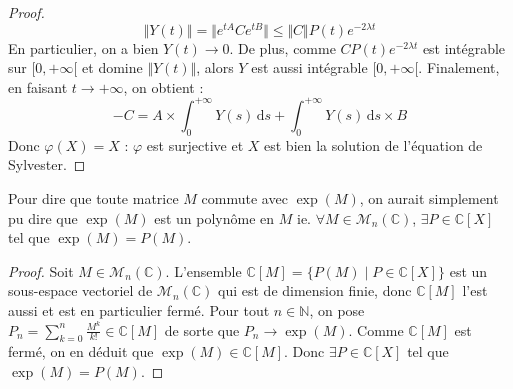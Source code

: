 \begin{proof}
		\[ \Vert Y(t) \Vert = \Vert e^{tA} C e^{tB} \Vert \leq \Vert C \Vert P(t) e^{-2 \lambda t} \]
		En particulier, on a bien $Y(t) \longrightarrow 0$. De plus, comme $C P(t) e^{-2 \lambda t}$ est intégrable sur $[0, +\infty[$ et domine $\Vert Y(t) \Vert$, alors $Y$ est aussi intégrable $[0, +\infty[$. Finalement, en faisant $t \longrightarrow +\infty$, on obtient :
		\[ -C = A \times \int_{0}^{+\infty} Y(s) \, \mathrm{d}s + \int_{0}^{+\infty} Y(s) \, \mathrm{d}s \times B \]
		Donc $\varphi(X) = X$ : $\varphi$ est surjective et $X$ est bien la solution de l'équation de Sylvester.
	\end{proof}


	\begin{remark}
		Pour dire que toute matrice $M$ commute avec $\exp(M)$, on aurait simplement pu dire que $\exp(M)$ est un polynôme en $M$ ie. $\forall M \in \mathcal{M}_n(\mathbb{C})$, $\exists P \in \mathbb{C}[X]$ tel que $\exp(M) = P(M)$.
	\end{remark}

	\begin{proof}
		Soit $M \in \mathcal{M}_n(\mathbb{C})$. L'ensemble $\mathbb{C}[M] = \{ P(M) \mid P \in \mathbb{C}[X] \}$ est un sous-espace vectoriel de $\mathcal{M}_n(\mathbb{C})$ qui est de dimension finie, donc $\mathbb{C}[M]$ l'est aussi et est en particulier fermé.
		\newpar
		Pour tout $n \in \mathbb{N}$, on pose $P_n = \sum_{k=0}^n \frac{M^k}{k!} \in \mathbb{C}[M]$ de sorte que $P_n \longrightarrow \exp(M)$. Comme $\mathbb{C}[M]$ est fermé, on en déduit que $\exp(M) \in \mathbb{C}[M]$. Donc $\exists P \in \mathbb{C}[X]$ tel que $\exp(M) = P(M)$.
	\end{proof}

